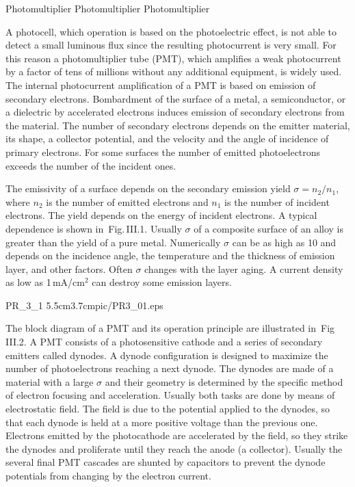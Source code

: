 
\setcounter{Chapter}{3}

\Addition
{Photomultiplier}
{Photomultiplier}
{Photomultiplier}

A photocell, which operation is based on the photoelectric effect, is not able to detect a small luminous flux since the resulting photocurrent is very small. For this reason a photomultiplier tube (PMT), which amplifies a weak photocurrent by a factor of tens of millions without any additional equipment, is widely used. The internal photocurrent amplification of a PMT is based on emission of secondary electrons. Bombardment of the surface of a metal, a semiconductor, or a dielectric by accelerated electrons induces emission of secondary electrons from the material. The number of secondary electrons depends on the emitter material, its shape, a collector potential, and the velocity and the angle of incidence of primary electrons. For some surfaces the number of emitted photoelectrons exceeds the number of the incident ones.

The emissivity of a surface depends on the secondary emission yield $\sigma=n_2/n_1$, where $n_2$ is the number of emitted electrons and $n_1$ is the number of incident electrons. The yield depends on the energy of incident electrons. A typical dependence is shown in~Fig.\,III.1. Usually $\sigma$ of a composite surface of an alloy is greater than the yield of a pure metal. Numerically $\sigma$ can be as high as 10 and depends on the incidence angle, the temperature and the thickness of emission layer, and other factors. Often $\sigma$ changes with the layer aging. A current density as low as 1\,mA/cm$^2$ can destroy some emission layers. 

%
PR_3_1
{5.5cm}{3.7cm}{pic/PR3_01.eps}
%

The block diagram of a PMT and its operation principle are illustrated in~Fig\,III.2. A PMT consists of a photosensitive cathode and a series of secondary emitters called dynodes. A dynode  configuration is designed to maximize the number of photoelectrons reaching a next dynode. The dynodes are made of a material with a large $\sigma$ and their geometry is determined by the specific method of electron focusing and acceleration. Usually both tasks are done by means of  electrostatic field. The field is due to the potential applied to the dynodes, so that each dynode is held at a more positive voltage than the previous one. Electrons emitted by the photocathode are accelerated by the field, so they strike the dynodes and proliferate until they reach the anode (a collector). Usually the several final PMT cascades are shunted by capacitors to prevent the dynode potentials from changing by the electron current. 

